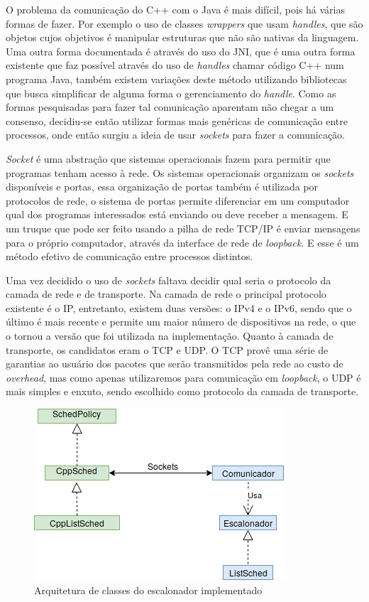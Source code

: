 O problema da comunicação do C++ com o Java é mais difícil, pois há várias formas de fazer. Por exemplo o uso de classes \textit{wrappers} que usam \textit{handles}, que são objetos cujos objetivos é manipular estruturas que não são nativas da linguagem\cite{CppJavaHandle}. Uma outra forma documentada é através do uso do \acrfull{JNI}, que é uma outra forma existente que faz possível através do uso de \textit{handles} chamar código C++ num programa Java\cite{CppJavaJNI}, também existem variações deste método utilizando bibliotecas que busca simplificar de alguma forma o gerenciamento do \textit{handle}. Como as formas pesquisadas para fazer tal comunicação aparentam não chegar a um consenso, decidiu-se então utilizar formas mais genéricas de comunicação entre processos, onde então surgiu a ideia de usar \textit{sockets} para fazer a comunicação.

\textit{Socket} é uma abstração que sistemas operacionais fazem para permitir que programas tenham acesso à rede. Os sistemas operacionais organizam os \textit{sockets} disponíveis e portas, essa organização de portas também é utilizada por protocolos de rede, o sistema de portas permite diferenciar em um computador qual dos programas interessados está enviando ou deve receber a mensagem. E um truque que pode ser feito usando a pilha de rede \acrshort{TCP/IP} é enviar mensagens para o próprio computador, através da interface de rede de \textit{loopback}. E esse é um método efetivo de comunicação entre processos distintos.

Uma vez decidido o uso de \textit{sockets} faltava decidir qual seria o protocolo da camada de rede e de transporte. Na camada de rede o principal protocolo existente é o \acrfull{IP}, entretanto, existem duas versões: o IPv4\cite{ipv4rfc} e o IPv6\cite{ipv6rfc}, sendo que o último é mais recente e permite um maior número de dispositivos na rede, o que o tornou a versão que foi utilizada na implementação. Quanto à camada de transporte, os candidatos eram o \acrshort{TCP}\cite{tcp_rfc} e \acrshort{UDP}\cite{udp_rfc}. O \acrshort{TCP} provê uma série de garantias ao usuário dos pacotes que serão transmitidos pela rede ao custo de \textit{overhead}, mas como apenas utilizaremos para comunicação em \textit{loopback}, o \acrshort{UDP} é mais simples e enxuto, sendo escolhido como protocolo da camada de transporte.

\begin{figure}[htbp]
	\centerline{\includegraphics[scale=0.7]{img/Proposta.png}}
	\caption{Arquitetura de classes do escalonador implementado}
	\label{ArquiteturaProposta}
\end{figure}


